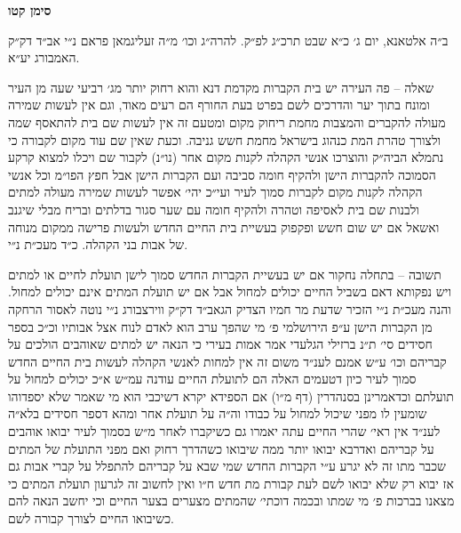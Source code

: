 \documentclass[12pt, openany]{book}
\newcommand{\chapname}{}
\newcommand{\newchap}[1]{
	\addcontentsline{toc}{chapter}{#1}
	\renewcommand{\chapname}{#1}
		\begin{center}
			\textbf{%
\fontsize{16pt}{16pt}\selectfont
				#1}
		\end{center}
}
\begin{document}
\newchap{סימן קטו}
\begin{multicols}{2}
ב״ה אלטאנא, יום ג׳ כ״א שבט תרכ״ג לפ״ק. להרה״ג וכו׳ מ״ה זעליגמאן פראם נ״י אב״ד דק״ק האמבורג יע״א.\\\vspace{0pt}

שאלה – פה העירה יש בית הקברות מקדמת דנא והוא רחוק יותר מג׳ רביעי שעה מן העיר ומונח בתוך יער והדרכים לשם בפרט בעת החורף הם רעים מאוד, וגם אין לעשות שמירה מעולה להקברים והמצבות מחמת ריחוק מקום ומטעם זה אין לעשות שם בית להתאסף שמה ולצורך טהרת המת כנהוג בישראל מחמת חשש גניבה. וכעת שאין שם עוד מקום לקבורה כי נתמלא הביה״ק והוצרכו אנשי הקהלה לקנות מקום אחר (נו״נ) לקבור שם ויכלו למצוא קרקע הסמוכה להקברות הישן ולהקיף חומה סביבה ועם הקברות הישן אבל חפץ הפו״מ וכל אנשי הקהלה לקנות מקום לקברות סמוך לעיר ועי״כ יהי׳ אפשר לעשות שמירה מעולה למתים ולבנות שם בית לאסיפה וטהרה ולהקיף חומה עם שער סגור בדלתים ובריח מבלי שיגנב ואשאל אם יש שום חשש ופקפוק בעשיית בית החיים החדש ולעשות פרישה ממקום מנוחה של אבות בני הקהלה. כ״ד מעכ״ת נ״י.\\\vspace{0pt}

תשובה – בתחלה נחקור אם יש בעשיית הקברות החדש סמוך לישן תועלת לחיים או למתים ויש נפקותא דאם בשביל החיים יכולים למחול אבל אם יש תועלת המתים אינם יכולים למחול. והנה מעכ״ת נ״י הזכיר שדעת מר חמיו הצדיק הגאב״ד דק״ק ווירצבורג נ״י נוטה לאסור הרחקה מן הקברות הישן ע״פ הירושלמי פ׳ מי שהפך ערב הוא לאדם לנוח אצל אבותיו וכ״כ בספר חסידים סי׳ ת״נ ברזילי הגלעדי אמר אמות בעירי כי הנאה יש למתים שאוהבים הולכים על קבריהם וכו׳ ע״ש אמנם לענ״ד משום זה אין למחות לאנשי הקהלה לעשות בית החיים החדש סמוך לעיר כיון דטעמים האלה הם לתועלת החיים עודנה עמ״ש א״כ יכולים למחול על תועלתם וכדאמרינן בסנהדרין (דף מ״ו) אם הספידא יקרא דשיכבי הוא מי שאמר שלא יספדוהו שומעין לו מפני שיכול למחול על כבודו וה״ה על תועלת אחר ומהא דספר חסידים בלא״ה לענ״ד אין ראי׳ שהרי החיים עתה יאמרו גם כשיקברו לאחר מ״ש בסמוך לעיר יבואו אוהבים על קבריהם ואדרבא יבואו יותר ממה שיבואו כשהדרך רחוק ואם מפני התועלת של המתים שכבר מתו זה לא יגרע ע״י הקברות החדש שמי שבא על קבריהם להתפלל על קברי אבות גם אז יבוא רק שלא יבואו לשם לעת קבורת מת חדש ח״ו ואין לחשוב זה לגרעון תועלת המתים כי מצאנו בברכות פ׳ מי שמתו ובכמה דוכתי׳ שהמתים מצערים בצער החיים וכי יחשב הנאה להם כשיבואו החיים לצורך קבורה לשם.\\\vspace{0pt}


\end{multicols}
\end{document}
